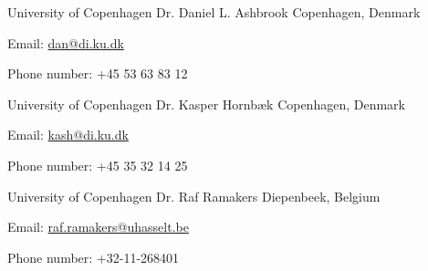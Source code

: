 \begin{cventries}
  \cventry
    {University of Copenhagen}
    {Dr. Daniel L. Ashbrook}
    {Copenhagen, Denmark}
    {}
    {
      \begin{cvitems}
        \item{Email: \href{mailto:dan@di.ku.dk}{dan@di.ku.dk}}
        \item{Phone number: +45 53 63 83 12}
      \end{cvitems}
      \vspace{1em}
    }

  \cventry
    {University of Copenhagen}
    {Dr. Kasper Hornb\ae k}
    {Copenhagen, Denmark}
    {}
    {
      \begin{cvitems}
        \item{Email: \href{mailto:kash@di.ku.dk}{kash@di.ku.dk}}
        \item{Phone number: +45 35 32 14 25}
      \end{cvitems}
      \vspace{1em}
    }

  \cventry
    {University of Copenhagen}
    {Dr. Raf Ramakers}
    {Diepenbeek, Belgium}
    {}
    {
      \begin{cvitems}
        \item{Email: \href{mailto:raf.ramakers@uhasselt.be}{raf.ramakers@uhasselt.be}}
        \item{Phone number: ​+32-11-268401}
      \end{cvitems}
      \vspace{1em}
    }

\end{cventries}
